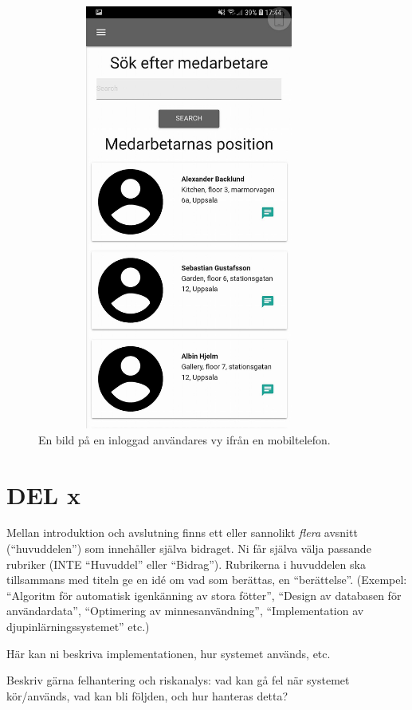 \documentclass[swedish, a4paper,12pt]{article}
\begin{document}
\begin{figure}[H]
  \centering
  \includegraphics[width=10cm, height=14cm]{media/mob_show_position.jpg}
  \caption{En bild på en inloggad användares vy ifrån en mobiltelefon.}
  \label{fig:mob_show_position}
\end{figure}


\iffalse
\section{DEL x}\label{sec:delX}
Mellan introduktion och avslutning finns ett eller sannolikt \emph{flera} avsnitt (``huvuddelen'') som innehåller själva bidraget.  Ni får själva välja passande rubriker (INTE ``Huvuddel'' eller ``Bidrag'').  Rubrikerna i huvuddelen ska tillsammans med titeln ge en idé om vad som berättas, en ``berättelse''. (Exempel: ``Algoritm för automatisk igenkänning av stora fötter'', ``Design av databasen för användardata'', ``Optimering av minnesanvändning'', ``Implementation av djupinlärningssystemet'' etc.)

Här kan ni beskriva implementationen, hur systemet används, etc.

Beskriv gärna felhantering och riskanalys: vad kan gå fel när systemet kör/används, vad kan bli följden, och hur hanteras detta?
\end{document}
